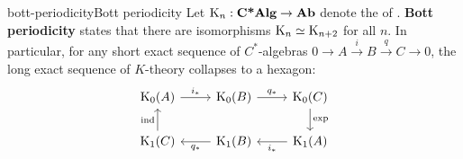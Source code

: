 \begin{topic}{bott-periodicity}{Bott periodicity}
    Let $\textup{K}_n : \textbf{C*Alg} \to \textbf{Ab}$ denote the  of . \textbf{Bott periodicity} states that there are isomorphisms $\textup{K}_n \simeq \textup{K}_{n + 2}$ for all $n$. In particular, for any short exact sequence of $C^*$-algebras $0 \to A \xrightarrow{i} B \xrightarrow{q} C \to 0$, the long exact sequence of $K$-theory collapses to a hexagon:
    \[ \begin{tikzcd}
        \textup{K}_0(A) \arrow{r}{i_*} & \textup{K}_0(B) \arrow{r}{q_*} & \textup{K}_0(C) \arrow{d}{\exp} \\ \textup{K}_1(C) \arrow{u}{\textup{ind}} & \textup{K}_1(B) \arrow{l}{q_*} & \textup{K}_1(A) \arrow{l}{i_*}
    \end{tikzcd} \]
\end{topic}


